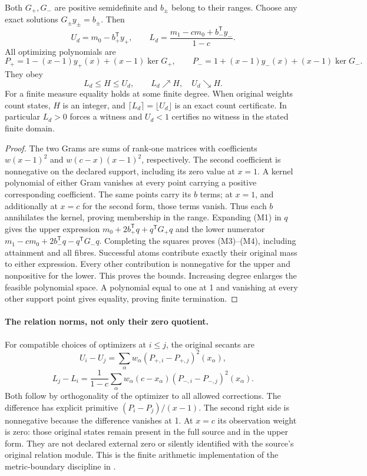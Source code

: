 \begin{theorem}
Both $G_+,G_-$ are positive semidefinite and $b_\pm$ belong to their ranges.
Choose any exact solutions $G_\pm y_\pm=b_\pm$. Then
\[
 \boxed{U_d=m_0-b_+^{\mathsf T}y_+,\qquad
 L_d=\frac{m_1-cm_0+b_-^{\mathsf T}y_-}{1-c}.}
 \tag{M3}
\]
All optimizing polynomials are
\[
 P_+=1-(x-1)y_+(x)+(x-1)\ker G_+,\qquad
 P_-=1+(x-1)y_-(x)+(x-1)\ker G_-.
 \tag{M4}
\]
They obey
\[
 \boxed{L_d\le H\le U_d,\qquad L_d\nearrow H,\quad U_d\searrow H.}
 \tag{M5}
\]
For a finite measure equality holds at some finite degree. When original
weights count states, $H$ is an integer, and $\lceil L_d\rceil=\lfloor U_d\rfloor$
is an exact count certificate. In particular $L_d>0$ forces a witness and
$U_d<1$ certifies no witness in the stated finite domain.
\end{theorem}
\begin{proof}
The two Grams are sums of rank-one matrices with coefficients
$w(x-1)^2$ and $w(c-x)(x-1)^2$, respectively. The second coefficient is
nonnegative on the declared support, including its zero value at $x=1$.
A kernel polynomial of either Gram vanishes at every point carrying a
positive corresponding coefficient. The same points carry its $b$ terms;
at $x=1$, and additionally at $x=c$ for the second form, those terms vanish.
Thus each $b$ annihilates the kernel, proving membership in the range.
Expanding (M1) in $q$ gives the upper expression
$m_0+2b_+^{\mathsf T}q+q^{\mathsf T}G_+q$ and the lower numerator
$m_1-cm_0+2b_-^{\mathsf T}q-q^{\mathsf T}G_-q$.
Completing the squares proves (M3)--(M4), including attainment and all fibres.
Successful atoms contribute exactly their original mass to either expression.
Every other contribution is nonnegative for the upper and nonpositive for
the lower. This proves the bounds. Increasing degree enlarges the feasible
polynomial space. A polynomial equal to one at 1 and vanishing at every other
support point gives equality, proving finite termination.
\end{proof}

\paragraph{The relation norms, not only their zero quotient.}
For compatible choices of optimizers at $i\le j$, the original secants are
\[
 U_i-U_j=\sum_\alpha w_\alpha(P_{+,i}-P_{+,j})^2(x_\alpha),
\]
\[
 L_j-L_i=\frac1{1-c}\sum_\alpha w_\alpha(c-x_\alpha)
              (P_{-,i}-P_{-,j})^2(x_\alpha).
 \tag{M6}
\]
Both follow by orthogonality of the optimizer to all allowed corrections.
The difference has explicit primitive $(P_i-P_j)/(x-1)$.
The second right side is nonnegative because the difference vanishes at 1.
At $x=c$ its observation weight is zero: those original states remain present
in the full source and in the upper form. They are not declared external zero
or silently identified with the source's original relation module. This is the
finite arithmetic implementation of the metric-boundary discipline in
\cite[sections 3--4]{SZ29}.

